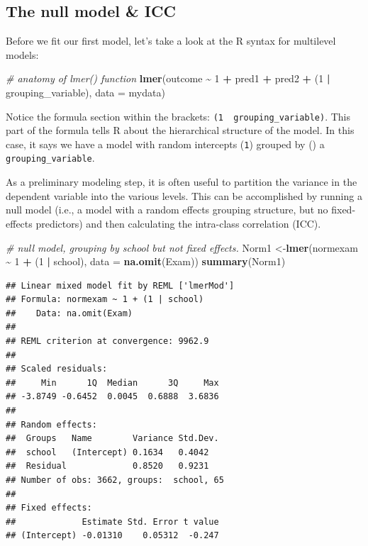 \documentclass[
]{book}
\newenvironment{Shaded}{\begin{snugshade}}{\end{snugshade}}
\newcommand{\CommentTok}[1]{\textcolor[rgb]{0.56,0.35,0.01}{\textit{#1}}}
\newcommand{\DataTypeTok}[1]{\textcolor[rgb]{0.13,0.29,0.53}{#1}}
\newcommand{\DecValTok}[1]{\textcolor[rgb]{0.00,0.00,0.81}{#1}}
\newcommand{\KeywordTok}[1]{\textcolor[rgb]{0.13,0.29,0.53}{\textbf{#1}}}
\newcommand{\NormalTok}[1]{#1}
\newcommand{\OperatorTok}[1]{\textcolor[rgb]{0.81,0.36,0.00}{\textbf{#1}}}
\newcommand{\StringTok}[1]{\textcolor[rgb]{0.31,0.60,0.02}{#1}}
\begin{document}
\hypertarget{the-null-model-icc}{%
\subsection{The null model \& ICC}\label{the-null-model-icc}}

Before we fit our first model, let's take a look at the R syntax for multilevel models:

\begin{Shaded}
\begin{Highlighting}[]
  \CommentTok{\# anatomy of lmer() function}
  \KeywordTok{lmer}\NormalTok{(outcome }\OperatorTok{\textasciitilde{}}\StringTok{ }\DecValTok{1} \OperatorTok{+}\StringTok{ }\NormalTok{pred1 }\OperatorTok{+}\StringTok{ }\NormalTok{pred2 }\OperatorTok{+}\StringTok{ }\NormalTok{(}\DecValTok{1} \OperatorTok{|}\StringTok{ }\NormalTok{grouping\_variable), }
       \DataTypeTok{data =}\NormalTok{ mydata)}
\end{Highlighting}
\end{Shaded}

Notice the formula section within the brackets: \texttt{(1\ \textbar{}\ grouping\_variable)}. This part of the formula tells R about the hierarchical structure of the model. In this case, it says we have a model with random intercepts (\texttt{1}) grouped by (\texttt{\textbar{}}) a \texttt{grouping\_variable}.

As a preliminary modeling step, it is often useful to partition the variance in the dependent variable into the various levels. This can be accomplished by running a null model (i.e., a model with a random effects grouping structure, but no fixed-effects predictors) and then calculating the intra-class correlation (ICC).

\begin{Shaded}
\begin{Highlighting}[]
  \CommentTok{\# null model, grouping by school but not fixed effects.}
\NormalTok{  Norm1 \textless{}{-}}\KeywordTok{lmer}\NormalTok{(normexam }\OperatorTok{\textasciitilde{}}\StringTok{ }\DecValTok{1} \OperatorTok{+}\StringTok{ }\NormalTok{(}\DecValTok{1} \OperatorTok{|}\StringTok{ }\NormalTok{school), }
               \DataTypeTok{data =} \KeywordTok{na.omit}\NormalTok{(Exam))}
  \KeywordTok{summary}\NormalTok{(Norm1)}
\end{Highlighting}
\end{Shaded}

\begin{verbatim}
## Linear mixed model fit by REML ['lmerMod']
## Formula: normexam ~ 1 + (1 | school)
##    Data: na.omit(Exam)
## 
## REML criterion at convergence: 9962.9
## 
## Scaled residuals: 
##     Min      1Q  Median      3Q     Max 
## -3.8749 -0.6452  0.0045  0.6888  3.6836 
## 
## Random effects:
##  Groups   Name        Variance Std.Dev.
##  school   (Intercept) 0.1634   0.4042  
##  Residual             0.8520   0.9231  
## Number of obs: 3662, groups:  school, 65
## 
## Fixed effects:
##             Estimate Std. Error t value
## (Intercept) -0.01310    0.05312  -0.247
\end{verbatim}
\end{document}
